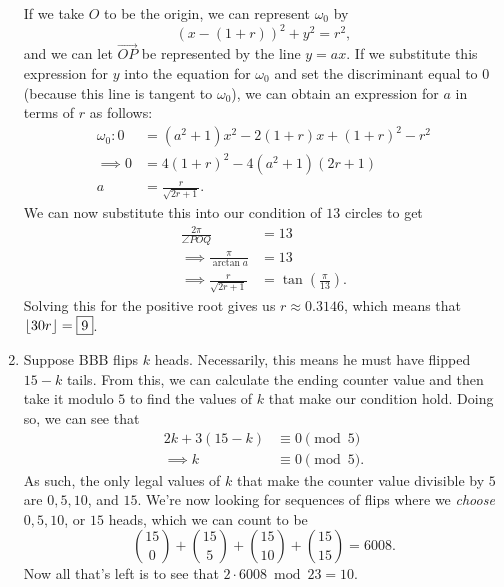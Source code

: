 \begin{enumerate}
    If we take \( O \) to be the origin, we can represent \( \omega_0 \) by
    \[
        \left( x - \left( 1 + r \right) \right)^2 + y^2 = r^2
    ,\]
    and we can let \( \overrightarrow{OP} \) be represented by the line \( y =
    ax \). If we substitute this expression for \( y \) into the equation for
    \( \omega_0 \) and set the discriminant equal to \( 0 \) (because this line
    is tangent to \( \omega_0 \)), we can obtain an expression for \( a \) in
    terms of \( r \) as follows:
    \begin{align*}
        \omega_0 \colon 0 &= \left( a^2 + 1 \right) x^2 - 2 \left( 1 + r \right)x + \left( 1 + r \right)^2 - r^2 \\
        \implies 0 &= 4 \left( 1 + r \right)^2 - 4 \left( a^2 + 1 \right) \left( 2r + 1 \right) \\
        a &= \frac{r}{\sqrt{2r + 1}}
    .\end{align*}
    We can now substitute this into our condition of \( 13 \) circles to get
    \begin{align*}
        \frac{2 \pi}{\angle POQ} &= 13 \\
        \implies \frac{\pi}{\arctan{a}} &= 13 \\
        \implies \frac{r}{\sqrt{2r + 1}} &= \tan{\left( \frac{\pi}{13} \right)}
    .\end{align*}
    Solving this for the positive root gives us \( r \approx 0.3146 \), which means that \( \left\lfloor 30r \right\rfloor = \boxed{9} \).

    \item Suppose BBB  flips \( k \) heads. Necessarily, this means he must
        have flipped \( 15 - k \) tails. From this, we can calculate the ending
        counter value and then take it modulo \( 5 \) to find the values of \(
        k \) that make our condition hold. Doing so, we can see that
        \begin{align*}
            2k + 3 \left( 15 - k \right) &\equiv 0 \pmod{5} \\
            \implies k &\equiv 0 \pmod{5}
        .\end{align*}
        As such, the only legal values of \( k \) that make the counter value
        divisible by \( 5 \) are \( 0, 5, 10 \), and \( 15 \). We're now
        looking for sequences of flips where we \textit{choose} \( 0, 5, 10 \),
        or \( 15 \) heads, which we can count to be
        \[
            \binom{15}{0} + \binom{15}{5} + \binom{15}{10} + \binom{15}{15} = 6008
        .\]
        Now all that's left is to see that \( 2 \cdot 6008 \bmod{23} = \boxed{10} \).

\end{enumerate}
